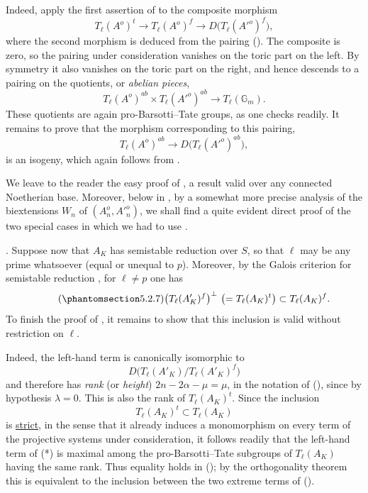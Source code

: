 Indeed, apply the first assertion of  to the composite morphism
\[
 T_\ell(A^o)^t
 \longrightarrow T_\ell(A^o)^f
 \longrightarrow D\bigl(T_\ell({A'}^o)^f\bigr),
\]
where the second morphism is deduced from the pairing ().  The
composite is zero, so the pairing under consideration vanishes on the
toric part on the left.  By symmetry it also vanishes on the toric part
on the right, and hence descends to a pairing on the quotients, or
\emph{abelian pieces},
\[
 T_\ell(A^o)^{ab}\times T_\ell({A'}^o)^{ab}
 \longrightarrow T_\ell(\mathbb G_m).
\]
These quotients are again pro-Barsotti--Tate groups, as one checks
readily.  It remains to prove that the morphism corresponding to this
pairing,
\[
 T_\ell(A^o)^{ab}
 \longrightarrow D\bigl(T_\ell({A'}^o)^{ab}\bigr),
\]
is an isogeny, which again follows from .

We leave to the reader the easy proof of , a result valid over any
connected Noetherian base.  Moreover, below in , by a somewhat
more precise analysis of the biextensions $W_n$ of
$(A_n^o,{A'}_n^o)$, we shall find a quite evident direct proof of
the two special cases in which we had to use .

\smallskip
\noindent
{}. Suppose now that $A_K$ has semistable reduction over $S$,
so that $\ell$ may be any prime whatsoever (equal or unequal to
$p$).  Moreover, by the Galois criterion for semistable reduction
, for $\ell\neq p$ one has
\begin{equation}\tag{\SGARefTarget{sga7.sga7i.eix.n5-2-7}{5.2.7}}
 \bigl(T_\ell(A'_K)^f\bigr)^\perp
 \ \bigl(=T_\ell(A_K)^t\bigr)
 \subset T_\ell(A_K)^f.
\end{equation}
To finish the proof of , it remains to show that this inclusion is
valid without restriction on $\ell$.

Indeed, the left-hand term is canonically isomorphic to
\[
 D\bigl(T_\ell(A'_K)/T_\ell(A'_K)^f\bigr)
\]
and therefore has \emph{rank} (or \emph{height})
$2n-2\alpha-\mu=\mu$, in the notation of (), since by
hypothesis $\lambda=0$.  This is also the rank of
$T_\ell(A_K)^t$.  Since the inclusion
\begin{equation}\tag{*}
 T_\ell(A_K)^t\subset T_\ell(A_K)
\end{equation}
is \underline{strict}, in the sense that it already induces a
monomorphism on every term of the projective systems under
consideration, it follows readily that the left-hand term of (*) is
maximal among the pro-Barsotti--Tate subgroups of $T_\ell(A_K)$
having the same rank.  Thus equality holds in (); by the
orthogonality theorem this is equivalent to the inclusion between the
two extreme terms of ().

